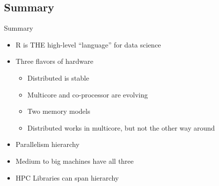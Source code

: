 \subsection{Summary}
\makesubcontentsslidessec

\begin{frame}
  \begin{block}{Summary}
    \begin{itemize}
    \item R is THE high-level ``language'' for data science
    \item Three flavors of hardware
      \begin{itemize}
      \item Distributed is stable
      \item Multicore and co-processor are evolving
      \item Two memory models
      \item Distributed works in multicore, but not the other way around
      \end{itemize}
    \item Parallelism hierarchy
    \item Medium to big machines have all three
    \item HPC Libraries can span hierarchy
    \end{itemize}
  \end{block}
\end{frame}